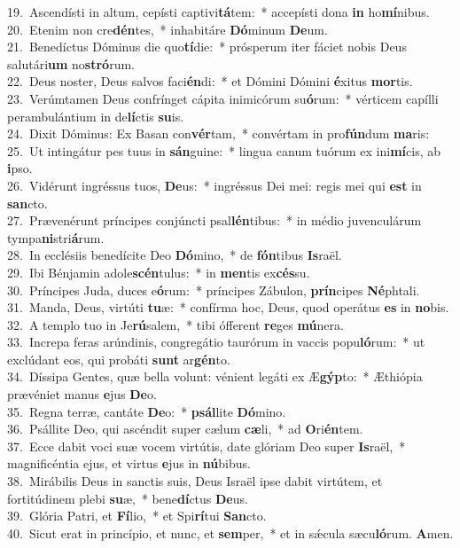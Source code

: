 {19.~}Ascendísti in altum, cepísti captivi\textbf{tá}tem:~* accepísti dona \textbf{in} ho\textbf{mí}nibus.\\
{20.~}Etenim non cre\textbf{dén}tes,~* inhabitáre \textbf{Dó}minum \textbf{De}um.\\
{21.~}Benedíctus Dóminus die quo\textbf{tí}die:~* prósperum iter fáciet nobis Deus salutári\textbf{um} no\textbf{stró}rum.\\
{22.~}Deus noster, Deus salvos faci\textbf{én}di:~* et Dómini Dómini \textbf{é}xitus \textbf{mor}tis.\\
{23.~}Verúmtamen Deus confrínget cápita inimicórum su\textbf{ó}rum:~* vérticem capílli perambulántium in de\textbf{lí}ctis \textbf{su}is.\\
{24.~}Dixit Dóminus: Ex Basan con\textbf{vér}tam,~* convértam in pro\textbf{fún}dum \textbf{ma}ris:\\
{25.~}Ut intingátur pes tuus in \textbf{sán}guine:~* lingua canum tuórum ex ini\textbf{mí}cis, ab \textbf{i}pso.\\
{26.~}Vidérunt ingréssus tuos, \textbf{De}us:~* ingréssus Dei mei: regis mei qui \textbf{est} in \textbf{san}cto.\\
{27.~}Prævenérunt príncipes conjúncti psal\textbf{lén}tibus:~* in médio juvenculárum tympa\textbf{ni}stri\textbf{á}rum.\\
{28.~}In ecclésiis benedícite Deo \textbf{Dó}mino,~* de \textbf{fón}tibus \textbf{Is}raël.\\
{29.~}Ibi Bénjamin adole\textbf{scén}tulus:~* in \textbf{men}tis ex\textbf{cés}su.\\
{30.~}Príncipes Juda, duces e\textbf{ó}rum:~* príncipes Zábulon, \textbf{prín}cipes \textbf{Né}phtali.\\
{31.~}Manda, Deus, virtúti \textbf{tu}æ:~* confírma hoc, Deus, quod operátus \textbf{es} in \textbf{no}bis.\\
{32.~}A templo tuo in Je\textbf{rú}salem,~* tibi ófferent \textbf{re}ges \textbf{mú}nera.\\
{33.~}Increpa feras arúndinis, congregátio taurórum in vaccis popu\textbf{ló}rum:~* ut exclúdant eos, qui probáti \textbf{sunt} ar\textbf{gén}to.\\
{34.~}Díssipa Gentes, quæ bella volunt: vénient legáti ex Æ\textbf{gýp}to:~* Æthiópia prævéniet manus \textbf{e}jus \textbf{De}o.\\
{35.~}Regna terræ, cantáte \textbf{De}o:~* \textbf{psál}lite \textbf{Dó}mino.\\
{36.~}Psállite Deo, qui ascéndit super cælum \textbf{cæ}li,~* ad \textbf{O}ri\textbf{én}tem.\\
{37.~}Ecce dabit voci suæ vocem virtútis, date glóriam Deo super \textbf{Is}raël,~* magnificéntia ejus, et virtus \textbf{e}jus in \textbf{nú}bibus.\\
{38.~}Mirábilis Deus in sanctis suis, Deus Israël ipse dabit virtútem, et fortitúdinem plebi \textbf{su}æ,~* bene\textbf{dí}ctus \textbf{De}us.\\
{39.~}Glória Patri, et \textbf{Fí}lio,~* et Spi\textbf{rí}tui \textbf{San}cto.\\
{40.~}Sicut erat in princípio, et nunc, et \textbf{sem}per,~* et in sǽcula sæcu\textbf{ló}rum. \textbf{A}men.\\
